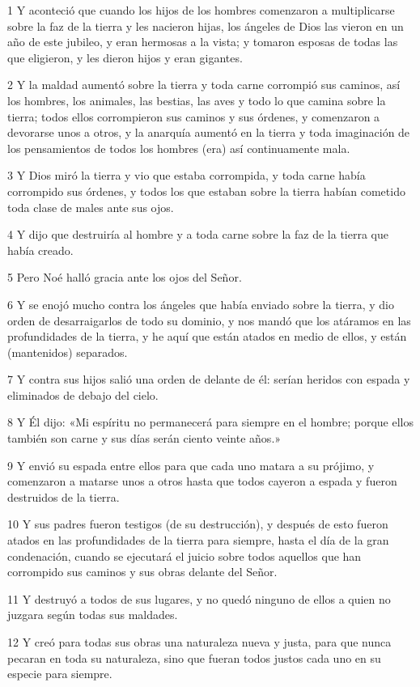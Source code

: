 \par 1 Y aconteció que cuando los hijos de los hombres comenzaron a multiplicarse sobre la faz de la tierra y les nacieron hijas, los ángeles de Dios las vieron en un año de este jubileo, y eran hermosas a la vista; y tomaron esposas de todas las que eligieron, y les dieron hijos y eran gigantes.
\par 2 Y la maldad aumentó sobre la tierra y toda carne corrompió sus caminos, así los hombres, los animales, las bestias, las aves y todo lo que camina sobre la tierra; todos ellos corrompieron sus caminos y sus órdenes, y comenzaron a devorarse unos a otros, y la anarquía aumentó en la tierra y toda imaginación de los pensamientos de todos los hombres (era) así continuamente mala.
\par 3 Y Dios miró la tierra y vio que estaba corrompida, y toda carne había corrompido sus órdenes, y todos los que estaban sobre la tierra habían cometido toda clase de males ante sus ojos.
\par 4 Y dijo que destruiría al hombre y a toda carne sobre la faz de la tierra que había creado.
\par 5 Pero Noé halló gracia ante los ojos del Señor.
\par 6 Y se enojó mucho contra los ángeles que había enviado sobre la tierra, y dio orden de desarraigarlos de todo su dominio, y nos mandó que los atáramos en las profundidades de la tierra, y he aquí que están atados en medio de ellos, y están (mantenidos) separados.
\par 7 Y contra sus hijos salió una orden de delante de él: serían heridos con espada y eliminados de debajo del cielo.
\par 8 Y Él dijo: «Mi espíritu no permanecerá para siempre en el hombre; porque ellos también son carne y sus días serán ciento veinte años.»
\par 9 Y envió su espada entre ellos para que cada uno matara a su prójimo, y comenzaron a matarse unos a otros hasta que todos cayeron a espada y fueron destruidos de la tierra.
\par 10 Y sus padres fueron testigos (de su destrucción), y después de esto fueron atados en las profundidades de la tierra para siempre, hasta el día de la gran condenación, cuando se ejecutará el juicio sobre todos aquellos que han corrompido sus caminos y sus obras delante del Señor.
\par 11 Y destruyó a todos de sus lugares, y no quedó ninguno de ellos a quien no juzgara según todas sus maldades.
\par 12 Y creó para todas sus obras una naturaleza nueva y justa, para que nunca pecaran en toda su naturaleza, sino que fueran todos justos cada uno en su especie para siempre.
